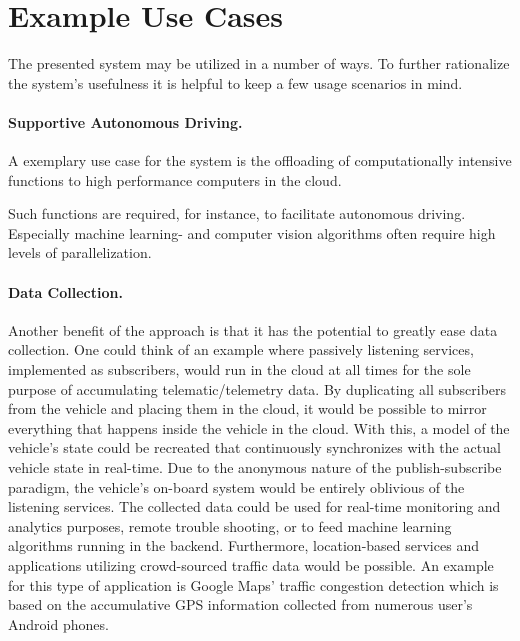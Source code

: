 \section{Example Use Cases} \label{sec:usecases}
The presented system may be utilized in a number of ways. To further rationalize the system's usefulness it is helpful to keep a few usage scenarios in mind.

\paragraph{Supportive Autonomous Driving.}
A exemplary use case for the system is the offloading of computationally intensive functions to high performance computers in the cloud.


Such functions are required, for instance, to facilitate autonomous driving. Especially machine learning- and computer vision algorithms often require high levels of parallelization.

\paragraph{Data Collection.}
Another benefit of the approach is that it has the potential to greatly ease data collection. One could think of an example where passively listening services, implemented as subscribers, would run in the cloud at all times for the sole purpose of accumulating telematic/telemetry data. By duplicating all subscribers from the vehicle and placing them in the cloud, it would be possible to mirror everything that happens inside the vehicle in the cloud. With this, a model of the vehicle's state could be recreated that continuously synchronizes with the actual vehicle state in real-time. Due to the anonymous nature of the publish-subscribe paradigm, the vehicle's on-board system would be entirely oblivious of the listening services. The collected data could be used for real-time monitoring and analytics purposes, remote trouble shooting, or to feed machine learning algorithms running in the backend. Furthermore, location-based services and applications utilizing crowd-sourced traffic data would be possible. An example for this type of application is Google Maps' traffic congestion detection which is based on the accumulative GPS information collected from numerous user's Android phones.

